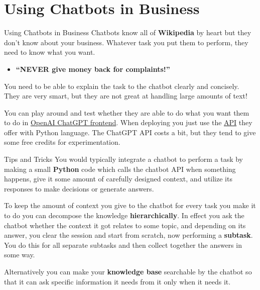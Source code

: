 \documentclass{beamer}
\begin{document}
\section{Using Chatbots in Business}
\begin{frame}{Using Chatbots in Business}
Chatbots know all of \textbf{Wikipedia} by heart but they don't know about your business. Whatever task you put them to perform, they need to know what you want.
  \begin{itemize}
    \item \textbf{``NEVER give money back for complaints!''}
  \end{itemize}
You need to be able to explain the task to the chatbot clearly and concisely. They are very smart, but they are not great at handling large amounts of text!

\vspace{0.5cm}

You can play around and test whether they are able to do what you want them to do in \textcolor{blue}{\href{https://chat.openai.com}{OpenAI ChatGPT frontend}}. When deploying you just use the \textcolor{blue}{\href{https://platform.openai.com/overview}{API}} they offer with Python language. The ChatGPT API costs a bit, but they tend to give some free credits for experimentation.
\end{frame}

\begin{frame}{Tips and Tricks}
You would typically integrate a chatbot to perform a task by making a small \textbf{Python} code which calls the chatbot API when something happens, give it some amount of carefully designed context, and utilize its responses to make decisions or generate answers.

To keep the amount of context you give to the chatbot for every task you make it to do you can decompose the knowledge \textbf{hierarchically}. In effect you ask the chatbot whether the context it got relates to some topic, and depending on its answer, you clear the session and start from scratch, now performing a \textbf{subtask}. You do this for all separate subtasks and then collect together the answers in some way.

Alternatively you can make your \textbf{knowledge base} searchable by the chatbot so that it can ask specific information it needs from it only when it needs it.
\end{frame}
\end{document}
